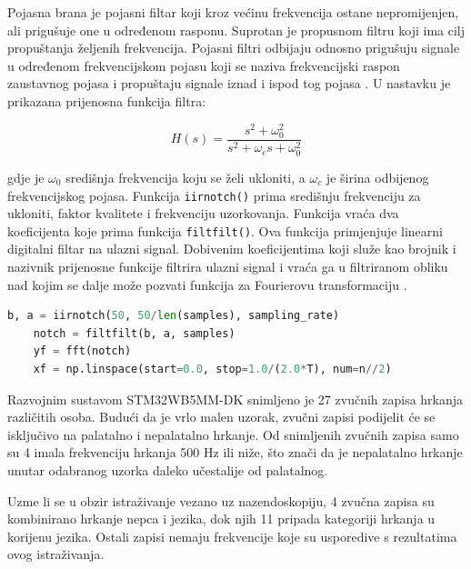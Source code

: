 Pojasna brana je pojasni filtar koji kroz većinu frekvencija ostane nepromijenjen, ali prigušuje one u određenom rasponu. Suprotan je propusnom filtru koji ima cilj propuštanja željenih frekvencija. Pojasni filtri odbijaju odnosno prigušuju signale u određenom frekvencijskom pojasu koji se naziva frekvencijski raspon zaustavnog pojasa i propuštaju signale iznad i ispod tog pojasa \cite{notch}.  U nastavku je prikazana prijenosna funkcija filtra:

\begin{equation}
	H(s) = \dfrac{s^2 + \omega_0^2}{s^2 + \omega_c s + \omega_0^2}
\end{equation}

\noindent gdje je \(\omega_0\) središnja frekvencija koju se želi ukloniti, a \(\omega_c\) je širina odbijenog frekvencijskog pojasa.  Funkcija \lstinline|iirnotch()| prima središnju frekvenciju za ukloniti, faktor kvalitete i frekvenciju uzorkovanja. Funkcija vraća dva koeficijenta koje prima funkcija \lstinline|filtfilt()|. Ova funkcija primjenjuje linearni digitalni filtar na ulazni signal. Dobivenim koeficijentima koji služe kao brojnik i nazivnik prijenosne funkcije filtrira ulazni signal i vraća ga u filtriranom obliku nad kojim se dalje može pozvati funkcija za Fourierovu transformaciju \cite{scipy}. 

\begin{lstlisting}[language=Python, caption={Primjena \textit{notch} filtra i Fourierove transformacije}]
	b, a = iirnotch(50, 50/len(samples), sampling_rate)
	notch = filtfilt(b, a, samples)
	yf = fft(notch)
	xf = np.linspace(start=0.0, stop=1.0/(2.0*T), num=n//2)
\end{lstlisting}

Razvojnim sustavom STM32WB5MM-DK snimljeno je 27 zvučnih zapisa hrkanja različitih osoba. Budući da je vrlo malen uzorak, zvučni zapisi podijelit će se isključivo na palatalno i nepalatalno hrkanje. Od snimljenih zvučnih zapisa samo su 4 imala frekvenciju hrkanja 500 Hz ili niže, što znači da je nepalatalno hrkanje unutar odabranog uzorka daleko učestalije od palatalnog.

Uzme li se u obzir istraživanje vezano uz nazendoskopiju, 4 zvučna zapisa su kombinirano hrkanje nepca i jezika, dok njih 11 pripada kategoriji hrkanja u korijenu jezika. Ostali zapisi nemaju frekvencije koje su usporedive s rezultatima ovog istraživanja.